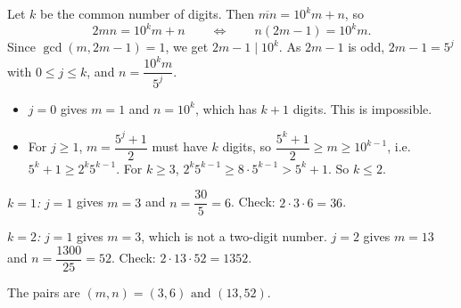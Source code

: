 Let $k$ be the common number of digits. Then $\overline{mn}=10^km+n$, so
\[2mn=10^km+n\qquad\Longleftrightarrow\qquad n(2m-1)=10^km.\]
Since $\gcd(m,2m-1)=1$, we get $2m-1\mid10^k$. As $2m-1$ is odd, $2m-1=5^j$ with $0\le j\le k$, and $n=\dfrac{10^km}{5^j}$.
\begin{itemize}
\item $j=0$ gives $m=1$ and $n=10^k$, which has $k+1$ digits. This is impossible.
\item For $j\ge1$, $m=\dfrac{5^j+1}{2}$ must have $k$ digits, so $\dfrac{5^k+1}{2}\ge m\ge10^{k-1}$, i.e. $5^k+1\ge2^k5^{k-1}$. For $k\ge3$, $2^k5^{k-1}\ge8\cdot5^{k-1}>5^k+1$. So $k\le2$.
\end{itemize}
\emph{$k=1$:} $j=1$ gives $m=3$ and $n=\dfrac{30}{5}=6$. Check: $2\cdot3\cdot6=36$.

\emph{$k=2$:} $j=1$ gives $m=3$, which is not a two-digit number. $j=2$ gives $m=13$ and $n=\dfrac{1300}{25}=52$. Check: $2\cdot13\cdot52=1352$.

The pairs are $\boxed{(m,n)=(3,6)\text{ and }(13,52)}$.
